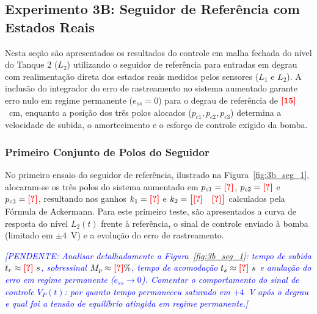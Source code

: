 \documentclass[a4paper,12pt]{article}
\newcommand{\dado}[1]{\textcolor{red}{\textbf{[#1]}}}
\newcommand{\pendente}[1]{\textcolor{blue}{\textit{[PENDENTE: #1]}}}
\newcommand{\dado}[1]{#1}
\newcommand{\pendente}[1]{}
\begin{document}
\newpage

\subsection{Experimento 3B: Seguidor de Referência com Estados Reais}

\begin{justify}
    \hspace{4ex}Nesta seção são apresentados os resultados do controle em malha fechada do nível do Tanque 2 ($L_2$) utilizando o seguidor de referência para entradas em degrau com realimentação direta dos estados reais medidos pelos sensores ($L_1$ e $L_2$). A inclusão do integrador do erro de rastreamento no sistema aumentado garante erro nulo em regime permanente ($e_{ss} = 0$) para o degrau de referência de $\dado{15}$~cm, enquanto a posição dos três polos alocados ($p_{c1}, p_{c2}, p_{c3}$) determina a velocidade de subida, o amortecimento e o esforço de controle exigido da bomba.
\end{justify}

\subsubsection{Primeiro Conjunto de Polos do Seguidor}

\begin{justify}
    \hspace{4ex}No primeiro ensaio do seguidor de referência, ilustrado na Figura~\ref{fig:3b_seg_1}, alocaram-se os três polos do sistema aumentado em $p_{c1} = \dado{?}$, $p_{c2} = \dado{?}$ e $p_{c3} = \dado{?}$, resultando nos ganhos $k_1 = \dado{?}$ e $k_2 = \begin{bmatrix} \dado{?} & \dado{?} \end{bmatrix}$ calculados pela Fórmula de Ackermann. Para este primeiro teste, são apresentados a curva de resposta do nível $L_2(t)$ frente à referência, o sinal de controle enviado à bomba (limitado em $\pm 4$~V) e a evolução do erro de rastreamento.
\end{justify}

\begin{justify}
    \hspace{4ex}\pendente{Analisar detalhadamente a Figura~\ref{fig:3b_seg_1}: tempo de subida $t_r \approx \dado{?}~s$, sobressinal $M_p \approx \dado{?}\%$, tempo de acomodação $t_s \approx \dado{?}~s$ e anulação do erro em regime permanente ($e_{ss} \to 0$). Comentar o comportamento do sinal de controle $V_P(t)$: por quanto tempo permaneceu saturado em $+4$~V após o degrau e qual foi a tensão de equilíbrio atingida em regime permanente.}
\end{justify}
\end{document}
